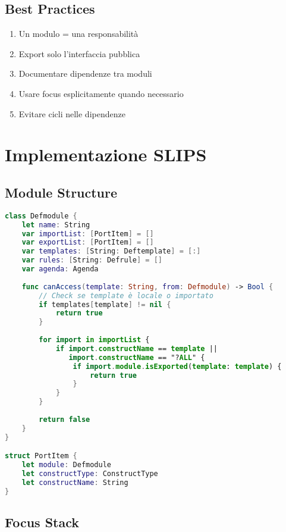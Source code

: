 \subsection{Best Practices}

\begin{infobox}
\begin{enumerate}
\item Un modulo = una responsabilità
\item Export solo l'interfaccia pubblica
\item Documentare dipendenze tra moduli
\item Usare focus esplicitamente quando necessario
\item Evitare cicli nelle dipendenze
\end{enumerate}
\end{infobox}

\section{Implementazione SLIPS}

\subsection{Module Structure}

\begin{lstlisting}[language=Swift]
class Defmodule {
    let name: String
    var importList: [PortItem] = []
    var exportList: [PortItem] = []
    var templates: [String: Deftemplate] = [:]
    var rules: [String: Defrule] = []
    var agenda: Agenda
    
    func canAccess(template: String, from: Defmodule) -> Bool {
        // Check se template è locale o importato
        if templates[template] != nil {
            return true
        }
        
        for import in importList {
            if import.constructName == template || 
               import.constructName == "?ALL" {
                if import.module.isExported(template: template) {
                    return true
                }
            }
        }
        
        return false
    }
}

struct PortItem {
    let module: Defmodule
    let constructType: ConstructType
    let constructName: String
}
\end{lstlisting}

\subsection{Focus Stack}

